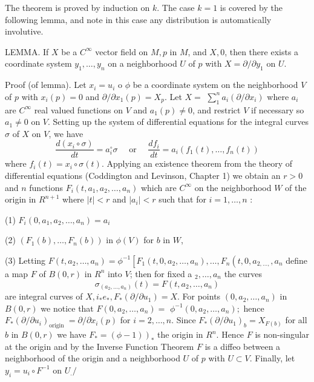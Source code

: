 \documentclass[10pt]{article}
\begin{document}
The theorem is proved by induction on $k$. The case $k=1$ is covered by the following lemma, and note in this case any distribution is automatically involutive.

LEMMA. If $X$ be a $C^{\infty}$ vector field on $M, p$ in $M$, and $X, 0$, then there exists a coordinate system $y_{1}, \ldots, y_{n}$ on a neighborhood $U$ of $p$ with $X=\partial / \partial y_{1}$ on $U$.

Proof (of lemma). Let $x_{i}=u_{i}$ o $\phi$ be a coordinate system on the neighborhood $V$ of $p$ with $x_{i}(p)=0$ and $\partial / \partial x_{1}(p)=X_{p}$. Let $X=$ $\sum_{1}^{n} a_{i}\left(\partial / \partial x_{i}\right)$ where $a_{i}$ are $C^{\infty}$ real valued functions on $V$ and $a_{1}(p) \neq 0$, and restrict $V$ if necessary so $a_{1} \neq 0$ on $V$. Setting up the system of differential equations for the integral curves $\sigma$ of $X$ on $V$, we have
$$
\frac{d\left(x_{i} \circ \sigma\right)}{d t}=a_{i}^{\circ} \sigma \quad \text { or } \quad \frac{d f_{i}}{d t}=a_{i}\left(f_{1}(t), \ldots, f_{n}(t)\right)
$$
where $f_{i}(t)=x_{i} \circ \sigma(t)$. Applying an existence theorem from the theory of differential equations (Coddington and Levinson, Chapter 1) we obtain an $r>0$ and $n$ functions $F_{i}\left(t, a_{1}, a_{2}, \ldots, a_{n}\right)$ which are $C^{\infty}$ on the neighborhood $W$ of the origin in $R^{n+1}$ where $|t|<r$ and $\left|a_{i}\right|<r$ such that for $i=1, \ldots, n$ :

(1) $F_{i}\left(0, a_{1}, a_{2}, \ldots, a_{n}\right)=a_{i}$

(2) $\left(F_{1}(b), \ldots, F_{n}(b)\right)$ in $\phi(V)$ for $b$ in $W$,

(3) Letting $F\left(t, a_{2}, \ldots, a_{n}\right)=\phi^{-1}\left[F_{1}\left(t, 0, a_{2}, \ldots, a_{n}\right), \ldots, F_{n}\left(t, 0, a_{2, \ldots,}, a_{n}\right.\right.$ define a map $F$ of $B(0, r)$ in $R^{n}$ into $V$; then for fixed a ${ }_{2}, \ldots, a_{n}$ the curves
$$
\sigma_{\left(a_{2}, \ldots, a_{n}\right)}(t)=F\left(t, a_{2}, \ldots, a_{n}\right)
$$
are integral curves of $X, i_{*} e_{*}, F_{*}\left(\partial / \partial u_{1}\right)=X$. For points $\left(0, a_{2}, \ldots, a_{n}\right)$ in $B(0, r)$ we notice that $F\left(0, a_{2}, \ldots, a_{n}\right)=$ $\phi^{-1}\left(0, a_{2}, \ldots, a_{n}\right) ;$ hence $F_{*}\left(\partial / \partial u_{i}\right)_{\text {origin }}=\partial / \partial x_{i}(p)$ for $i=2, \ldots, n$. Since $F_{*}\left(\partial / \partial u_{1}\right)_{b}=X_{F(b)}$ for all $b$ in $B(0, r)$ we have $\left.F_{*}=(\phi-1)\right)_{*}$ the origin in $R^{n}$. Hence $F$ is non-singular at the origin and by the Inverse Function Theorem $F$ is a diffeo between a neighborhood of the origin and a neighborhood $U$ of $p$ with $U \subset V$. Finally, let $y_{i}=u_{i} \circ F^{-1}$ on $U_{.} /$
\end{document}
